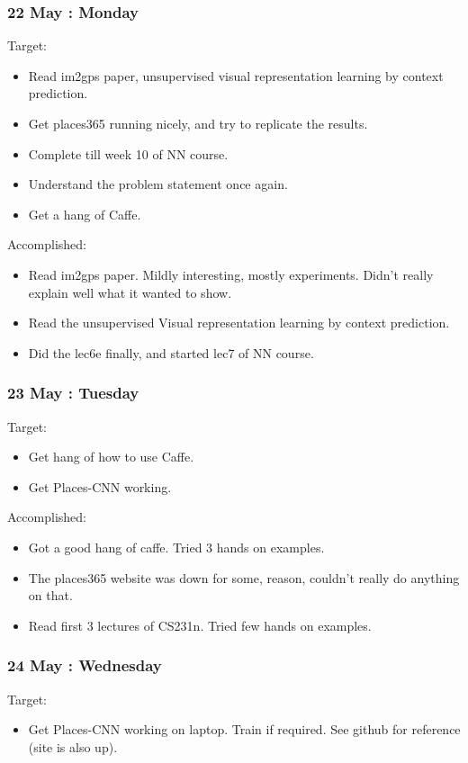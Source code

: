 \documentclass{article}
\begin{document}
\subsubsection{22 May : Monday}
Target:
\begin{itemize}
\item Read im2gps paper, unsupervised visual representation learning by context prediction.
\item Get places365 running nicely, and try to replicate the results.
\item Complete till week 10 of NN course.
\item Understand the problem statement once again.
\item Get a hang of Caffe.
\end{itemize}
Accomplished:
\begin{itemize}
\item Read im2gps paper. Mildly interesting, mostly experiments. Didn't really explain well what it wanted to show.
\item Read the unsupervised Visual representation learning by context prediction.
\item Did the lec6e finally, and started lec7 of NN course.
\end{itemize}

\subsubsection{23 May : Tuesday}
Target:
\begin{itemize}
\item Get hang of how to use Caffe.
\item Get Places-CNN working.
\end{itemize}

Accomplished:
\begin{itemize}
\item Got a good hang of caffe. Tried 3 hands on examples.
\item The places365 website was down for some, reason, couldn't really do anything on that.
\item Read first 3 lectures of CS231n. Tried few hands on examples.
\end{itemize}

\subsubsection{24 May : Wednesday}
Target:
\begin{itemize}
\item Get Places-CNN working on laptop. Train if required. See github for reference (site is also up).
\end{itemize}
\end{document}

